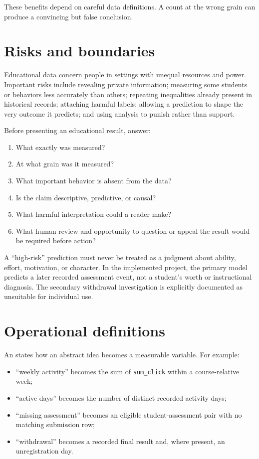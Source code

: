 These benefits depend on careful data definitions. A count at the wrong grain
can produce a convincing but false conclusion.

\section{Risks and boundaries}

Educational data concern people in settings with unequal resources and power.
Important risks include revealing private information; measuring some students
or behaviors less accurately than others; repeating inequalities already
present in historical records; attaching harmful labels; allowing a prediction
to shape the very outcome it predicts; and using analysis to punish rather than
support.

\begin{validationbox}
Before presenting an educational result, answer:
\begin{enumerate}
  \item What exactly was measured?
  \item At what grain was it measured?
  \item What important behavior is absent from the data?
  \item Is the claim descriptive, predictive, or causal?
  \item What harmful interpretation could a reader make?
  \item What human review and opportunity to question or appeal the result
    would be required before action?
\end{enumerate}
\end{validationbox}

A ``high-risk'' prediction must never be treated as a judgment about ability,
effort, motivation, or character. In the implemented project, the primary
model predicts a later recorded assessment event, not a student's worth or
instructional diagnosis. The secondary withdrawal investigation is explicitly
documented as unsuitable for individual use.

\section{Operational definitions}

An  states how an abstract idea becomes a
measurable variable. For example:

\begin{itemize}
  \item ``weekly activity'' becomes the sum of \texttt{sum\_click} within a
    course-relative week;
  \item ``active days'' becomes the number of distinct recorded activity days;
  \item ``missing assessment'' becomes an eligible student-assessment pair with
    no matching submission row;
  \item ``withdrawal'' becomes a recorded final result and, where present, an
    unregistration day.
\end{itemize}

